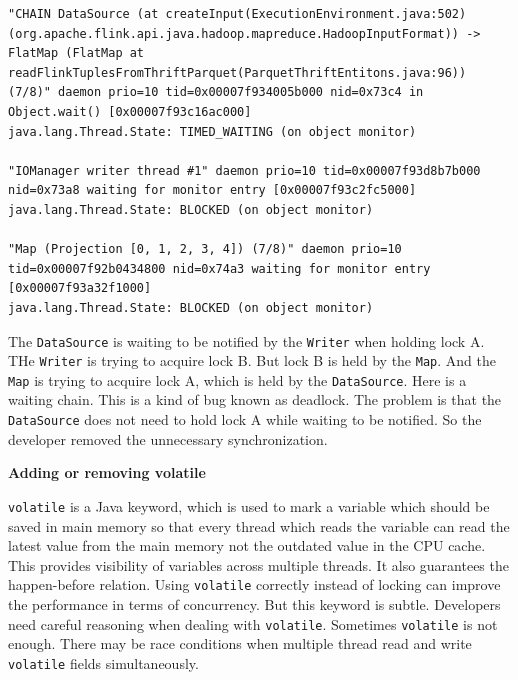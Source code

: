 \documentclass[conference]{IEEEtran}
\begin{document}
\begin{lstlisting}
"CHAIN DataSource (at createInput(ExecutionEnvironment.java:502) (org.apache.flink.api.java.hadoop.mapreduce.HadoopInputFormat)) -> FlatMap (FlatMap at readFlinkTuplesFromThriftParquet(ParquetThriftEntitons.java:96)) (7/8)" daemon prio=10 tid=0x00007f934005b000 nid=0x73c4 in Object.wait() [0x00007f93c16ac000]
java.lang.Thread.State: TIMED_WAITING (on object monitor)

"IOManager writer thread #1" daemon prio=10 tid=0x00007f93d8b7b000 nid=0x73a8 waiting for monitor entry [0x00007f93c2fc5000]
java.lang.Thread.State: BLOCKED (on object monitor)

"Map (Projection [0, 1, 2, 3, 4]) (7/8)" daemon prio=10 tid=0x00007f92b0434800 nid=0x74a3 waiting for monitor entry [0x00007f93a32f1000]
java.lang.Thread.State: BLOCKED (on object monitor)
\end{lstlisting}

The \texttt{DataSource} is waiting to be notified by the \texttt{Writer} when holding lock A. THe \texttt{Writer} is trying to acquire lock B. But lock B is held by the \texttt{Map}. And the \texttt{Map} is trying to acquire lock A, which is held by the \texttt{DataSource}. Here is a waiting chain. This is a kind of bug known as deadlock. The problem is that the \texttt{DataSource} does not need to hold lock A while waiting to be notified. So the developer removed the unnecessary synchronization.

\textbf{Adding or removing volatile}

\texttt{volatile} is a Java keyword, which is used to mark a variable which should be saved in main memory so that every thread which reads the variable can read the latest value from the main memory not the outdated value in the CPU cache. This provides visibility of variables across multiple threads. It also guarantees the happen-before relation. Using \texttt{volatile} correctly instead of locking can improve the performance in terms of concurrency. But this keyword is subtle. Developers need careful reasoning when dealing with \texttt{volatile}. Sometimes \texttt{volatile} is not enough. There may be race conditions when multiple thread read and write \texttt{volatile} fields simultaneously.
\end{document}
